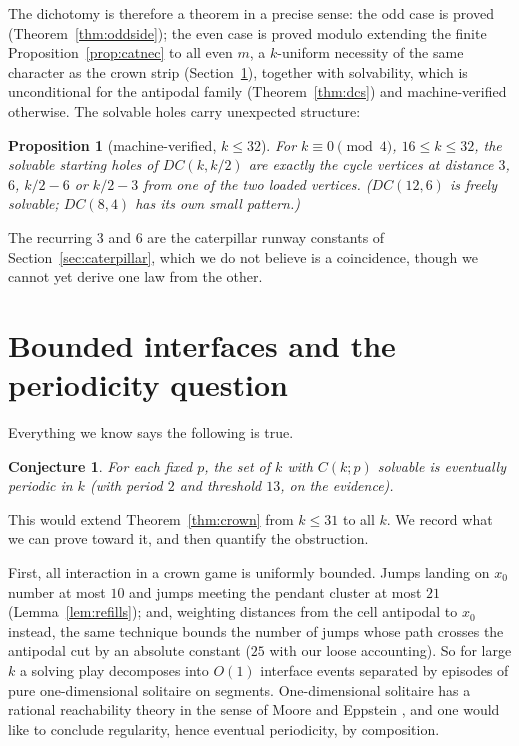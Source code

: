 \documentclass[11pt]{article}
\newtheorem{proposition}[theorem]{Proposition}
\newtheorem{conjecture}[theorem]{Conjecture}
\theoremstyle{definition}
\begin{document}
The dichotomy is therefore a theorem in a precise sense: the odd case
is proved (Theorem~\ref{thm:oddside}); the even case is proved modulo
extending the finite Proposition~\ref{prop:catnec} to all even $m$, a
$k$-uniform necessity of the same character as the crown strip
(Section~\ref{sec:periodicity}), together with solvability, which is
unconditional for the antipodal family (Theorem~\ref{thm:dcs}) and
machine-verified otherwise. The solvable holes carry unexpected
structure:

\begin{proposition}[machine-verified, $k\le 32$]\label{prop:distlaw}
For $k\equiv0\pmod4$, $16\le k\le32$, the solvable starting holes
of $DC(k,k/2)$ are exactly the cycle vertices at distance
$3$, $6$, $k/2-6$ or $k/2-3$ from one of the two loaded vertices.
($DC(12,6)$ is freely solvable; $DC(8,4)$ has its own small
pattern.)
\end{proposition}

The recurring $3$ and $6$ are the caterpillar runway constants of
Section~\ref{sec:caterpillar}, which we do not believe is a
coincidence, though we cannot yet derive one law from the other.

\section{Bounded interfaces and the periodicity question}
\label{sec:periodicity}

Everything we know says the following is true.

\begin{conjecture}\label{conj:periodic}
For each fixed $p$, the set of $k$ with $C(k;p)$ solvable is
eventually periodic in $k$ (with period $2$ and threshold $13$, on
the evidence).
\end{conjecture}

This would extend Theorem~\ref{thm:crown} from $k\le31$ to all $k$.
We record what we can prove toward it, and then quantify the
obstruction.

First, all interaction in a crown game is uniformly bounded. Jumps
landing on $x_0$ number at most $10$ and jumps meeting the pendant
cluster at most $21$ (Lemma~\ref{lem:refills}); and, weighting
distances from the cell antipodal to $x_0$ instead, the same
technique bounds the number of jumps whose path crosses the
antipodal cut by an absolute constant ($25$ with our loose
accounting). So for large $k$ a solving play decomposes into $O(1)$
interface events separated by episodes of pure one-dimensional
solitaire on segments. One-dimensional solitaire has a rational
reachability theory in the sense of Moore and Eppstein \cite{ME},
and one would like to conclude regularity, hence eventual
periodicity, by composition.
\end{document}
